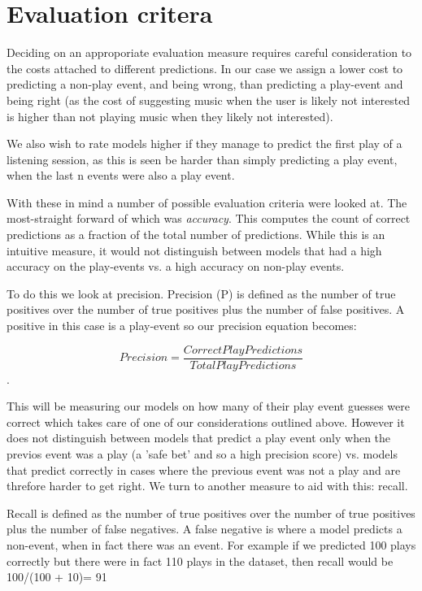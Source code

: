 \section{Evaluation critera}

Deciding on an approporiate evaluation measure requires careful consideration to the costs attached to different predictions. In our case we assign a lower cost to predicting a non-play event, and being wrong, than predicting a play-event and being right (as the cost of suggesting music when the user is likely not interested is higher than not playing music when they likely not interested). 

We also wish to rate models higher if they manage to predict the first play of a listening session, as this is seen be harder than simply predicting a play event, when the last n events were also a play event.

With these in mind a number of possible evaluation criteria were looked at. The most-straight forward of which was \textit{accuracy}. This computes the count of correct predictions as a fraction of the total number of predictions. While this is an intuitive measure, it would not distinguish between models that had a high accuracy on the play-events vs. a high accuracy on non-play events. 

To do this we look at precision. Precision (P) is defined as the number of true positives over the number of true positives plus the number of false positives. A positive in this case is a play-event so our precision equation becomes:

$$Precision = \frac{Correct Play Predictions}{Total Play Predictions}$$. 

This will be measuring our models on how many of their play event guesses were correct which takes care of one of our considerations outlined above. However it does not distinguish between models that predict a play event only when the previos event was a play (a 'safe bet' and so a high precision score) vs. models that predict correctly in cases where the previous event was not a play and are threfore harder to get right. We turn to another measure to aid with this: recall.

Recall is defined as the number of true positives over the number of true positives plus the number of false negatives. A false negative is where a model predicts a non-event, when in fact there was an event. For example if we predicted 100 plays correctly but there were in fact 110 plays in the dataset, then recall would be 100/(100 + 10)= 91%

